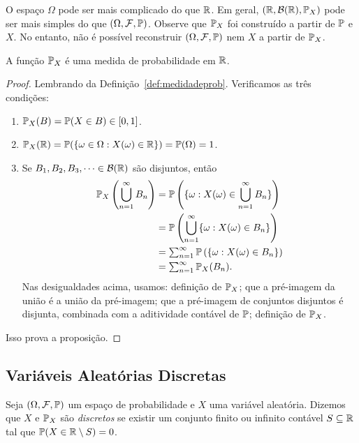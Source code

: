 \begin{remark}
O espaço $ \Omega $ pode ser mais complicado do que $ \mathbb{R} $.
Em geral, $ (\mathbb{R}, \mathcal B(\mathbb{R}), \mathbb{P}_X) $ pode ser mais simples do que $ (\Omega, \mathcal F, \mathbb{P}) $.
Observe que $ \mathbb{P}_X $ foi construído a partir de $ \mathbb{P} $ e $ X $.
No entanto, não é possível reconstruir $ (\Omega, \mathcal F, \mathbb{P}) $ nem $ X $ a partir de $ \mathbb{P}_X $.
\end{remark}

\begin{proposition}
A função $ \mathbb{P}_X $ é uma medida de probabilidade em $ \mathbb{R} $.
\end{proposition}
\begin{proof}
Lembrando da Definição~\ref{def:medidadeprob}.
Verificamos as três condições:
\begin{enumerate}
[$ (i) $]
\item
$ \mathbb{P}_X(B) = \mathbb{P}(X \in B) \in [0,1] $.
\item
$ \mathbb{P}_X(\mathbb{R}) = \mathbb{P}(\{\omega \in \Omega : X(\omega) \in \mathbb{R} \})
= \mathbb{P}(\Omega) = 1
$.
\item
Se $ B_1, B_2, B_3, \dots \in \mathcal B(\mathbb{R}) $ são disjuntos, então
\begin{align}
\mathbb{P}_X\left(\bigcup_{n=1}^{\infty} B_n\right)
&=
\mathbb{P}\left(\{\omega : X(\omega) \in \bigcup_{n=1}^\infty B_n \} \right)
\\
&=
\mathbb{P}\left(\bigcup_{n=1}^\infty \{\omega : X(\omega) \in B_n \} \right)
\\
&=
\textstyle
\sum_{n=1}^\infty \mathbb{P}\left(\{\omega : X(\omega) \in B_n \} \right)
\\
&=
\textstyle
\sum_{n=1}^\infty \mathbb{P}_X(B_n)
.
\end{align}
Nas desigualdades acima, usamos:
definição de $ \mathbb{P}_X $;
que a pré-imagem da união é a união da pré-imagem;
que a pré-imagem de conjuntos disjuntos é disjunta, combinada com a aditividade contável de $ \mathbb{P} $;
definição de $ \mathbb{P}_X $.
\end{enumerate}
Isso prova a proposição.
\end{proof}

\subsection{Variáveis Aleatórias Discretas}

\begin{definition}
Seja $ (\Omega, \mathcal F, \mathbb{P}) $ um espaço de probabilidade e $ X $ uma variável aleatória.
Dizemos que $ X $ e $ \mathbb{P}_X $ são \emph{discretos} se existir um conjunto finito ou infinito contável $ S \subseteq \mathbb{R} $ tal que $ \mathbb{P}(X \in \mathbb{R} \setminus S) = 0 $.
\end{definition}

